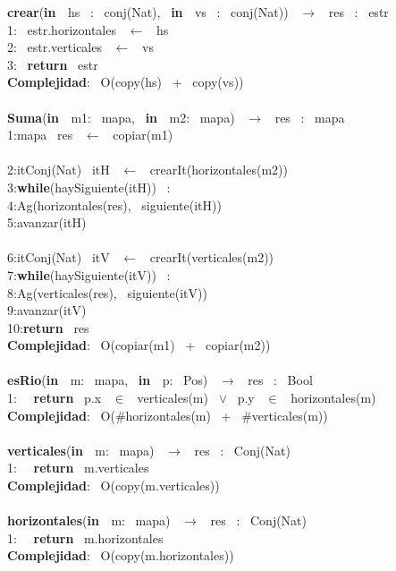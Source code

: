 \noindent \makebox[\linewidth]{\rule{\textwidth}{0.4pt}}
\textbf{crear}(\textbf{in \ }hs \ : \ conj(Nat), \ \textbf{in \ }vs \ : \ conj(Nat)) \ $\longrightarrow$ \ res \ : \ estr\\
1: \ estr.horizontales \ $\leftarrow$ \ hs\\
2: \ estr.verticales \ $\leftarrow$ \ vs \ \\
3: \ \textbf{return} \ estr\\
\textbf{Complejidad}: \ O(copy(hs) \ + \ copy(vs))\\
\makebox[\linewidth]{\rule{\textwidth}{0.4pt}}
\\
\makebox[\linewidth]{\rule{\textwidth}{0.4pt}}
\textbf{Suma}(\textbf{in \ }m1: \ mapa, \ \textbf{in \ }m2: \ mapa) \ $\longrightarrow$ \ res \ : \ mapa\\
1:\indent mapa \ res \ $\leftarrow$ \ copiar(m1)\\
\\
2:\indent itConj(Nat) \ itH \ $\leftarrow$ \ crearIt(horizontales(m2))\\
3:\indent \textbf{while}(haySiguiente(itH)) \ :\\
4:\indent \indent Ag(horizontales(res), \ siguiente(itH))\\
5:\indent \indent avanzar(itH)\\
\\
6:\indent itConj(Nat) \ itV \ $\leftarrow$ \ crearIt(verticales(m2))\\
7:\indent \textbf{while}(haySiguiente(itV)) \ :\\
8:\indent \indent Ag(verticales(res), \ siguiente(itV))\\
9:\indent \indent avanzar(itV)\\
10:\indent \textbf{return} \ res\\
\textbf{Complejidad}: \ O(copiar(m1) \ + \ copiar(m2))\\
\makebox[\linewidth]{\rule{\textwidth}{0.4pt}}
\\
\makebox[\linewidth]{\rule{\textwidth}{0.4pt}}
\textbf{esRio}(\textbf{in \ }m: \ mapa, \ \textbf{in \ }p: \ Pos) \ $\longrightarrow$ \ res \ : \ Bool\\
1: \  \ \textbf{return} \ p.x \ $\in$ \ verticales(m) \ $\vee$ \ p.y \ $\in$ \ horizontales(m)\\
\textbf{Complejidad}: \ O($ \# $horizontales(m) \ + \ $ \# $verticales(m))\\
\makebox[\linewidth]{\rule{\textwidth}{0.4pt}}
\\
\makebox[\linewidth]{\rule{\textwidth}{0.4pt}}
\textbf{verticales}(\textbf{in \ }m: \ mapa) \ $\longrightarrow$ \ res \ : \ Conj(Nat)\\
1: \  \ \textbf{return} \ m.verticales\\
\textbf{Complejidad}: \ O(copy(m.verticales))\\
\makebox[\linewidth]{\rule{\textwidth}{0.4pt}}
\\
\makebox[\linewidth]{\rule{\textwidth}{0.4pt}}
\textbf{horizontales}(\textbf{in \ }m: \ mapa) \ $\longrightarrow$ \ res \ : \ Conj(Nat)\\
1: \  \ \textbf{return} \ m.horizontales\\
\textbf{Complejidad}: \ O(copy(m.horizontales))\\
\makebox[\linewidth]{\rule{\textwidth}{0.4pt}}